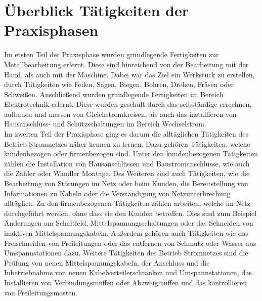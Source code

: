 \chapter*{Überblick Tätigkeiten der Praxisphasen} %

Im ersten Teil der Praxisphase wurden grundlegende Fertigkeiten zur Metallbearbeitung erlernt. Diese sind hinreichend von der Bearbeitung mit der Hand, 
als auch mit der Maschine. Dabei war das Ziel ein Werkstück zu erstellen, durch Tätigkeiten wie Feilen, Sägen, Biegen, Bohren, Drehen, Fräsen oder Schweißen. 
Anschließend wurden grundlegende Fertigkeiten im Bereich Elektrotechnik erlernt. Diese wurden geschult durch das selbständige errechnen, aufbauen und messen 
von Gleichstromkreisen, als auch das installieren von Hausanschluss- und Schützschaltungen im Bereich Wechselstrom.\\
Im zweiten Teil der Praxisphase ging es darum die alltäglichen Tätigkeiten des Betrieb Stromnetzes näher kennen zu lernen. Dazu gehören Tätigkeiten, 
welche kundenbezogen oder firmenbezogen sind. Unter den kundenbezogenen Tätigkeiten zählen die Installation von Hausanschlüssen und Baustromanschlüsse, 
wie auch die Zähler oder Wandler Montage. Des Weiteren sind auch Tätigkeiten, wie die Bearbeitung von Störungen im Netz oder beim Kunden, die Bereitstellung 
von Informationen zu Kabeln oder die Verständigung von Netzunterbrechung alltäglich. Zu den firmenbezogenen Tätigkeiten zählen arbeiten, welche im Netz 
durchgeführt werden, ohne dass sie den Kunden betreffen. Dies sind zum Beispiel Änderungen am Schaltfeld, Mittelspannungsschaltungen oder das Schneiden von 
inaktiven Mittelspannungskabeln. Außerdem gehören auch Tätigkeiten wie das Freischneiden von Freileitungen oder das entfernen von Schmutz oder Wasser aus 
Umspannstationen dazu. Weitere Tätigkeiten des Betrieb Stromnetzes sind die Prüfung von neuen Mittelspannungskabeln, der Anschluss und die Inbetriebnahme 
von neuen Kabelverteilerschränken und Umspannstationen, das Installieren von Verbindungsmuffen oder Abzweigmuffen und das kontrollieren von Freileitungsmasten.


\clearpage
